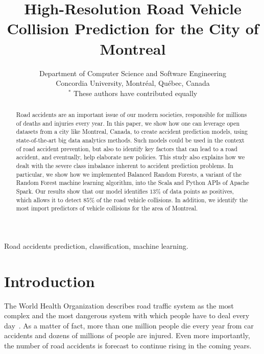 \documentclass[conference]{IEEEtran}
\begin{document}
\title{High-Resolution Road Vehicle Collision Prediction for the City of Montreal}
\author{
Department of Computer Science and Software Engineering \\
Concordia University, Montréal, Québec, Canada\\
$^*$ These authors have contributed equally

}

\maketitle

\begin{abstract}
Road accidents are an important issue of our modern societies, responsible
for millions of deaths and injuries every year. In this paper, we show how one can
leverage open datasets from a city like Montreal, Canada, to create
accident prediction models, using state-of-the-art big data analytics
methods. Such models could be used in the context of road accident
prevention, but also to identify key factors that can lead to a road
accident, and eventually, help elaborate new policies. This study also
explains how we dealt with the severe class imbalance inherent to accident
prediction problems. In particular, we show
how we implemented Balanced Random Forests, a variant of the Random Forest
machine learning algorithm, into the Scala and Python APIs of Apache Spark.
Our results show that our model identifies $13\%$ of data points as positives, 
which allows it to detect $85\%$ of the road vehicle collisions. In addition,
we identify the most import predictors of vehicle collisions for the area of 
Montreal.

\end{abstract}

\begin{IEEEkeywords}
Road accidents prediction, classification, machine learning.
\end{IEEEkeywords}

\section{Introduction}

The World Health Organization describes road traffic system as the most
complex and the most dangerous system with which people have to deal every
day~\cite{Peden2004}. As a matter of fact, more than one million people
die every year from car accidents and dozens of millions of people are
injured. Even more importantly, the number of road accidents is forecast to
continue rising in the coming years.
\end{document}
